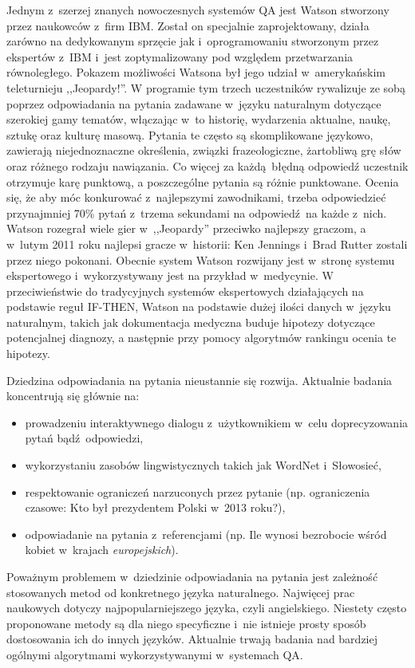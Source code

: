 \documentclass[a4paper, twoside, 12pt]{report}
\begin{document}
            Jednym z~szerzej znanych nowoczesnych systemów QA jest Watson stworzony przez naukowców z~firm IBM.
            Został on specjalnie zaprojektowany, działa zarówno na dedykowanym sprzęcie jak i~oprogramowaniu stworzonym
            przez ekspertów z~IBM i~jest zoptymalizowany pod względem przetwarzania równoległego.
            Pokazem możliwości Watsona był jego udział w~amerykańskim teleturnieju ,,Jeopardy!''. W programie tym
            trzech uczestników rywalizuje ze sobą poprzez odpowiadania na pytania zadawane w~języku naturalnym dotyczące
            szerokiej gamy tematów, włączając w~to historię, wydarzenia aktualne, naukę, sztukę oraz kulturę masową.
            Pytania te często są skomplikowane językowo, zawierają niejednoznaczne określenia, związki frazeologiczne,
            żartobliwą grę słów oraz różnego rodzaju nawiązania.
            Co więcej za każdą błędną odpowiedź uczestnik otrzymuje karę punktową, a poszczególne pytania są różnie
            punktowane. Ocenia się, że aby móc konkurować z~najlepszymi zawodnikami, trzeba odpowiedzieć przynajmniej
            70\% pytań z~trzema sekundami na odpowiedź na każde z~nich. Watson rozegrał wiele gier w~,,Jeopardy'' przeciwko
            najlepszy graczom, a w~lutym 2011 roku najlepsi gracze w~historii: Ken Jennings i~Brad Rutter zostali przez
            niego pokonani. Obecnie system Watson rozwijany jest w~stronę systemu ekspertowego i~wykorzystywany jest na
            przykład w~medycynie. W przeciwieństwie do tradycyjnych systemów ekspertowych działających na podstawie
            reguł IF-THEN, Watson na podstawie dużej ilości danych w~języku naturalnym, takich jak  dokumentacja medyczna
            buduje hipotezy dotyczące potencjalnej diagnozy, a następnie przy pomocy algorytmów rankingu ocenia te
            hipotezy\cite{WATSONMEDICINE}.

            Dziedzina odpowiadania na pytania nieustannie się rozwija. Aktualnie badania koncentrują się głównie na:
            \begin{itemize}
                \item prowadzeniu interaktywnego dialogu z~użytkownikiem w~celu doprecyzowania pytań bądź odpowiedzi,
                \item wykorzystaniu zasobów lingwistycznych takich jak WordNet i~Słowosieć,
                \item respektowanie ograniczeń narzuconych przez pytanie (np. ograniczenia czasowe: Kto był prezydentem
                    Polski w~2013 roku?),
                \item odpowiadanie na pytania z~referencjami (np. Ile wynosi bezrobocie wśród kobiet w~krajach \emph{europejskich}).
            \end{itemize}
            Poważnym problemem w~dziedzinie odpowiadania na pytania jest zależność stosowanych metod od konkretnego języka
            naturalnego. Najwięcej prac naukowych dotyczy najpopularniejszego języka, czyli angielskiego. Niestety
            często proponowane metody są dla niego specyficzne i~nie istnieje prosty sposób dostosowania ich do innych
            języków. Aktualnie trwają badania nad bardziej ogólnymi algorytmami wykorzystywanymi w~systemach QA.
\end{document}
